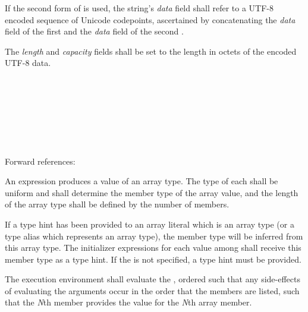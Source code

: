 \specsubsubitem
If the second form of  is used, the string's
\textit{data} field shall refer to a UTF-8 encoded sequence of Unicode
codepoints, ascertained by concatenating the \textit{data} field of the first
 and the \textit{data} field of the second
.

\specsubsubitem
The \textit{length} and \textit{capacity} fields shall be set to the length in
octets of the encoded UTF-8 data.


\begin{grammar}
 \\
	\terminal{[}  \terminal{]} \\

 \\
	 \optional{\terminal{,}} \\
	  \optional{\terminal{,}} \\
	 \terminal{,}  \\
\end{grammar}

Forward references: 

\specsubsubitem
An  expression produces a value of an array type.
The type of each  shall be uniform and shall
determine the member type of the array value, and the length of the array type
shall be defined by the number of members.

\specsubsubitem
If a type hint has been provided to an array literal which is an array type (or
a type alias which represents an array type), the member type will be inferred
from this array type. The initializer expressions for each value among
 shall receive this member type as a type hint. If
the  is not specified, a type hint must be provided.

\specsubsubitem
The execution environment shall evaluate the ,
ordered such that any side-effects of evaluating the arguments occur in the
order that the members are listed, such that the \textit{N}th member provides
the value for the \textit{N}th array member.


